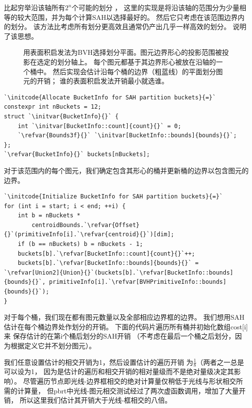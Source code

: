 比起穷举沿该轴所有$2^n$个可能的划分
，
这里的实现是将沿该轴的范围分为少量相等的较大范围，并为每个计算SAH以选择最好的。
然后它只考虑在该范围边界内的划分。
该方法比考虑所有划分更高效且通常仍产出几乎一样高效的划分。
说明了该思想。
\begin{figure}[htbp]
    \centering
    \caption{用表面积启发法为BVH选择划分平面。图元边界形心的投影范围被投影在选定的划分轴上。
        每个图元都基于其边界形心被放在沿轴的一个桶中。
        然后实现会估计沿每个桶的边界（粗蓝线）的平面划分图元的开销；
        谁的表面积启发法开销最小就选谁。}
    \label{fig:4.6}
\end{figure}
\begin{lstlisting}
`\initcode{Allocate BucketInfo for SAH partition buckets}{=}`
constexpr int nBuckets = 12;
struct `\initvar{BucketInfo}{}` {
    int `\initvar[BucketInfo::count]{count}{}` = 0;
    `\refvar{Bounds3f}{}` `\initvar[BucketInfo::bounds]{bounds}{}`;
};
`\refvar{BucketInfo}{}` buckets[nBuckets];
\end{lstlisting}

对于该范围内的每个图元，我们确定包含其形心的桶\protect{}并更新桶的边界以包含图元的边界。
\begin{lstlisting}
`\initcode{Initialize BucketInfo for SAH partition buckets}{=}`
for (int i = start; i < end; ++i) {
    int b = nBuckets * 
        centroidBounds.`\refvar{Offset}{}`(primitiveInfo[i].`\refvar{centroid}{}`)[dim];
    if (b == nBuckets) b = nBuckets - 1;
    buckets[b].`\refvar[BucketInfo::count]{count}{}`++;
    buckets[b].`\refvar[BucketInfo::bounds]{bounds}{}` = `\refvar[Union2]{Union}{}`(buckets[b].`\refvar[BucketInfo::bounds]{bounds}{}`, primitiveInfo[i].`\refvar[BVHPrimitiveInfo::bounds]{bounds}{}`);
}
\end{lstlisting}

对于每个桶，我们现在都有图元数量以及全部相应边界框的边界。
我们想用SAH估计在每个桶边界处作划分的开销。
下面的代码片遍历所有桶并初始化数组{\ttfamily cost[i]}来
保存估计的在第{\ttfamily i}个桶后划分的SAH开销
（不考虑在最后一个桶之后划分，因为根据定义它并不划分图元）。

我们任意设置估计的相交开销为1，然后设置估计的遍历开销
为$\displaystyle\frac{1}{8}$（两者之一总是可以设为1，
因为是估计的遍历和相交开销的相对量级而不是绝对量级决定其影响）。
尽管遍历节点即光线-边界框相交的绝对计算量仅稍低于光线与形状相交所需的计算量，
但pbrt中光线-图元相交测试经过了两次虚函数调用，增加了大量开销，
所以这里我们估计其开销大于光线-框相交的八倍。

